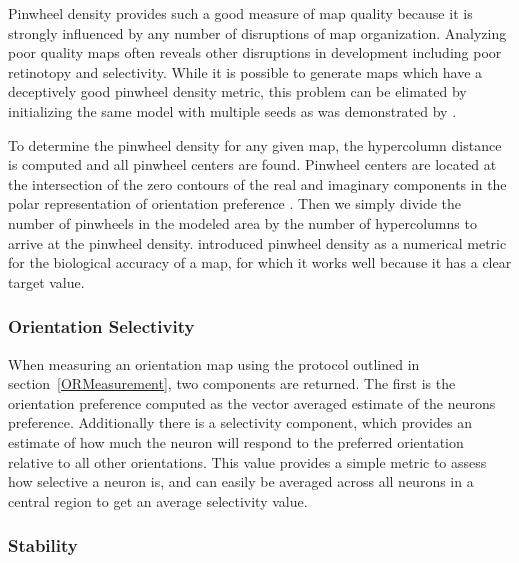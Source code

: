 Pinwheel density provides such a good measure of map quality because
it is strongly influenced by any number of disruptions of map
organization. Analyzing poor quality maps often reveals other
disruptions in development including poor retinotopy and
selectivity. While it is possible to generate maps which have a
deceptively good pinwheel density metric, this problem can be elimated
by initializing the same model with multiple seeds as was demonstrated
by \cite{Stevens2013}.

To determine the pinwheel density for any given map, the hypercolumn
distance is computed and all pinwheel centers are found. Pinwheel
centers are located at the intersection of the zero contours of the
real and imaginary components in the polar representation of
orientation preference \citep{Lowel1998}. Then we simply divide the
number of pinwheels in the modeled area by the number of hypercolumns
to arrive at the pinwheel density.  \cite{Stevens2013} introduced
pinwheel density as a numerical metric for the biological accuracy of
a map, for which it works well because it has a clear target value.

\subsubsection*{Orientation Selectivity}

When measuring an orientation map using the protocol outlined in
section~\ref{ORMeasurement}, two components are returned. The first is
the orientation preference computed as the vector averaged estimate of
the neurons preference. Additionally there is a selectivity component,
which provides an estimate of how much the neuron will respond to the
preferred orientation relative to all other orientations. This value
provides a simple metric to assess how selective a neuron is, and can
easily be averaged across all neurons in a central region to get an
average selectivity value.

\subsubsection*{Stability}

